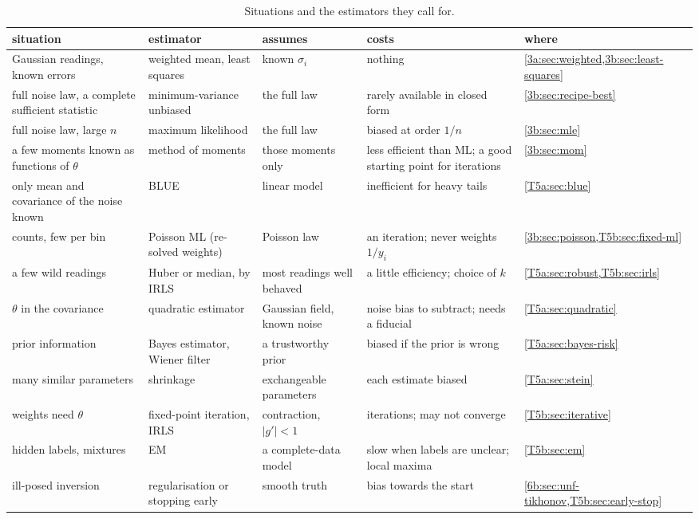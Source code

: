 \begin{table}[htbp]
\centering
\caption{Situations and the estimators they call for.}
\label{T5b:tab:field-guide}
\small
\begin{tabularx}{\linewidth}{@{}>{\raggedright}p{25mm}>{\raggedright}p{23mm}>{\raggedright}X>{\raggedright}X>{\raggedright\arraybackslash}p{21mm}@{}}
\toprule
situation & estimator & assumes & costs & where\\
\midrule
Gaussian readings, known errors & weighted mean, least squares & known $\sigma_i$ & nothing & \cref{3a:sec:weighted,3b:sec:least-squares}\\
full noise law, a complete sufficient statistic & minimum-variance unbiased & the full law & rarely available in closed form & \cref{3b:sec:recipe-best}\\
full noise law, large $n$ & maximum likelihood & the full law & biased at order $1/n$ & \cref{3b:sec:mle}\\
a few moments known as functions of $\theta$ & method of moments & those moments only & less efficient than ML; a good starting point for iterations & \cref{3b:sec:mom}\\
only mean and covariance of the noise known & BLUE & linear model & inefficient for heavy tails & \cref{T5a:sec:blue}\\
counts, few per bin & Poisson ML (re-solved weights) & Poisson law & an iteration; never weights $1/y_i$ & \cref{3b:sec:poisson,T5b:sec:fixed-ml}\\
a few wild readings & Huber or median, by IRLS & most readings well behaved & a little efficiency; choice of $k$ & \cref{T5a:sec:robust,T5b:sec:irls}\\
$\theta$ in the covariance & quadratic estimator & Gaussian field, known noise & noise bias to subtract; needs a fiducial & \cref{T5a:sec:quadratic}\\
prior information & Bayes estimator, Wiener filter & a trustworthy prior & biased if the prior is wrong & \cref{T5a:sec:bayes-risk}\\
many similar parameters & shrinkage & exchangeable parameters & each estimate biased & \cref{T5a:sec:stein}\\
weights need $\theta$ & fixed-point iteration, IRLS & contraction, $|g'|<1$ & iterations; may not converge & \cref{T5b:sec:iterative}\\
hidden labels, mixtures & EM & a complete-data model & slow when labels are unclear; local maxima & \cref{T5b:sec:em}\\
ill-posed inversion & regularisation or stopping early & smooth truth & bias towards the start & \cref{6b:sec:unf-tikhonov,T5b:sec:early-stop}\\

\end{tabularx}
\end{table}

